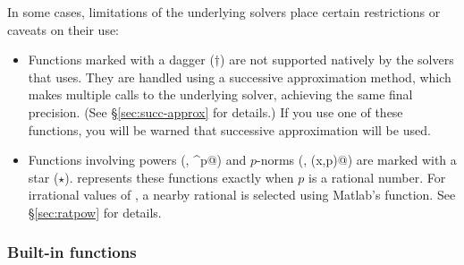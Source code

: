 \documentclass[12pt]{article}
\begin{document}
In some cases, limitations of the underlying solvers place certain restrictions
or caveats on their use:
\begin{itemize}
\item Functions marked with a dagger ($\dagger$) are not supported natively by
      the solvers that \cvx uses.  They are handled using
a successive approximation method, which makes multiple calls to the 
underlying solver, achieving the same final precision.
(See \S\ref{sec:succ-approx} for details.)
If you use one of these functions, you will be warned that successive 
approximation will be used.

\item Functions involving powers (\eg, \verb@x^p@) and $p$-norms (\eg, \verb@norm(x,p)@)
      are marked with a star ($\star$). \cvx represents these functions exactly
      when $p$ is a rational number. For irrational values of \verb@p@, a nearby
      rational is selected using Matlab's \verb@rat@ function. See 
      \S\ref{sec:ratpow} for details.
\end{itemize}      

\subsubsection{Built-in functions}
\end{document}
